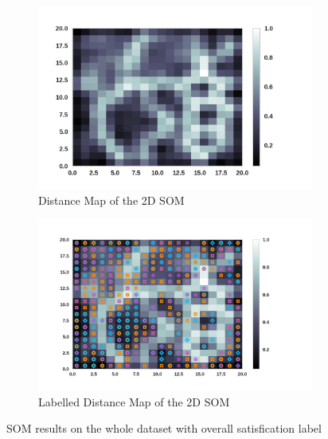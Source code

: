 \documentclass[12pt]{article}
\begin{document}
\begin{figure}
    \centering
    \begin{subfigure}[b]{0.47\textwidth}
        \includegraphics[width=\textwidth]{images/som-satisfication.png}
        \caption{Distance Map of the 2D SOM}
        \label{fig:som-satisfication}
    \end{subfigure}
    \begin{subfigure}[b]{0.47\textwidth}
        \includegraphics[width=\textwidth]{images/som-satisfication-label.png}
        \caption{Labelled Distance Map of the 2D SOM}
        \label{fig:som-satisfication}
    \end{subfigure}
    \caption{SOM results on the whole dataset with overall satisfication label}\label{fig:som-satisfication1}
\end{figure} 
\end{document}
